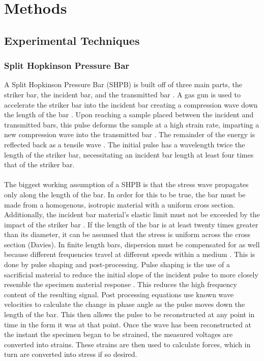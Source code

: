 \documentclass[12pt]{article}
\begin{document}
\section{Methods}

\subsection{Experimental Techniques} 

\subsubsection {Split Hopkinson Pressure Bar} %

A Split Hopkinson Pressure Bar (SHPB) is built off of three main parts, the striker bar, the incident bar, and the transmitted bar \cite{Frew} \cite{Follansbee} \cite{Frew2002}. A gas gun is used to accelerate the striker bar into the incident bar creating a compression wave down the length of the bar \cite{Frew}. Upon reaching a sample placed between the incident and transmitted bars, this pulse deforms the sample at a high strain rate, imparting a new compression wave into the transmitted bar \cite{Dai}. The remainder of the energy is reflected back as a tensile wave \cite{Gama}. The initial pulse has a wavelength twice the length of the striker bar, necessitating an incident bar length at least four times that of the striker bar.
\\ \\
The biggest working assumption of a SHPB is that the stress wave propagates only along the length of the bar. In order for this to be true, the bar must be made from a homogenous, isotropic material with a uniform cross section. Additionally, the incident bar material's elastic limit must not be exceeded by the impact of the striker bar \cite{Gama}. If the length of the bar is at least twenty times greater than its diameter, it can be assumed that the stress is uniform across the cross section (Davies). In finite length bars, dispersion must be compensated for as well because different frequencies travel at different speeds within a medium \cite{Gama}. This is done by pulse shaping and post-processing. Pulse shaping is the use of a sacrificial material to reduce the initial slope of the incident pulse to more closely resemble the specimen material response \cite{Frew2002}. This reduces the high frequency content of the resulting signal. Post processing equations use known wave velocities to calculate the change in phase angle as the pulse moves down the length of the bar. This then allows the pulse to be reconstructed at any point in time in the form it was at that point. Once the wave has been reconstructed at the instant the specimen began to be strained, the measured voltages are converted into strains. These strains are then used to calculate forces, which in turn are converted into stress if so desired. 
\end{document}
